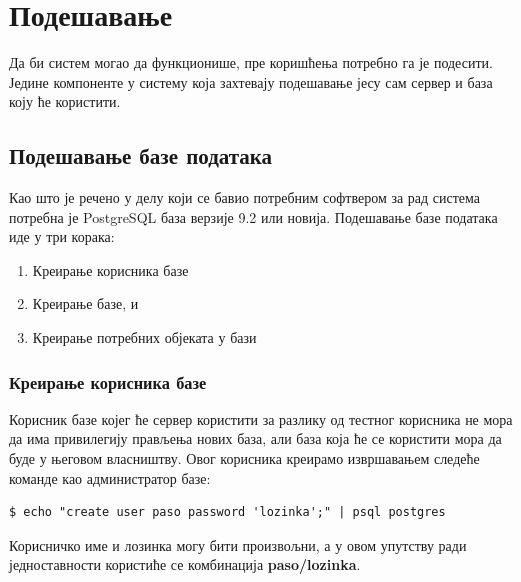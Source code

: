 \documentclass[a4paper, 12pt, diplomski]{etfcyr}
\begin{document}
		\newpage
		
		\section{Подешавање}
			\begin{justify}
				Да би систем могао да функционише, пре коришћења потребно га је подесити. Једине компоненте у систему која захтевају подешавање јесу сам сервер и база коју ће користити.
			\end{justify}

				\subsection{Подешавање базе података}
					\begin{justify}
						Као што је речено у делу који се бавио потребним софтвером за рад система потребна је PostgreSQL база верзије 9.2 или новија. Подешавање базе података иде у три корака:
						\begin{enumerate}[noitemsep]
							\item Креирање корисника базе
							\item Креирање базе, и
							\item Креирање потребних објеката у бази
						\end{enumerate}
					\end{justify}

					\subsubsection*{Креирање корисника базе}
						\begin{justify}
							Корисник базе којег ће сервер користити за разлику од тестног корисника не мора да има привилегију прављења нових база, али база која ће се користити мора да буде у његовом власништву. Овог корисника креирамо извршавањем следеће команде као администратор базе:
							\begin{footnotesize}
								\begin{verbatim}
$ echo "create user paso password 'lozinka';" | psql postgres
								\end{verbatim}
							\end{footnotesize}
							Корисничко име и лозинка могу бити произвољни, а у овом упутству ради једноставности користиће се комбинација \textbf{paso/lozinka}.
						\end{justify}
\end{document}
